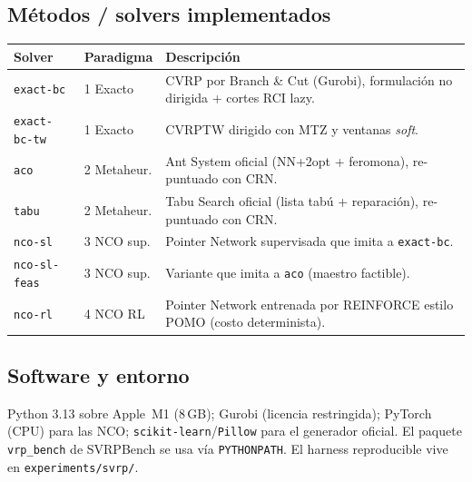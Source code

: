 \documentclass[11pt,a4paper]{article}
\newcommand{\code}[1]{\texttt{\small #1}}
\begin{document}
\subsection*{Métodos / solvers implementados}
\begin{longtable}{p{2.7cm}p{2.0cm}p{9.6cm}}
  \toprule
  \textbf{Solver} & \textbf{Paradigma} & \textbf{Descripción}\\
  \midrule
  \endhead
  \code{exact-bc} & 1 Exacto & CVRP por Branch \& Cut (Gurobi), formulación no dirigida + cortes RCI lazy.\\
  \code{exact-bc-tw} & 1 Exacto & CVRPTW dirigido con MTZ y ventanas \emph{soft}.\\
  \code{aco} & 2 Metaheur. & Ant System oficial (NN+2opt + feromona), re-puntuado con CRN.\\
  \code{tabu} & 2 Metaheur. & Tabu Search oficial (lista tabú + reparación), re-puntuado con CRN.\\
  \code{nco-sl} & 3 NCO sup. & Pointer Network supervisada que imita a \code{exact-bc}.\\
  \code{nco-sl-feas} & 3 NCO sup. & Variante que imita a \code{aco} (maestro factible).\\
  \code{nco-rl} & 4 NCO RL & Pointer Network entrenada por REINFORCE estilo POMO (costo determinista).\\
  \bottomrule
\end{longtable}

\subsection*{Software y entorno}
Python 3.13 sobre Apple~M1 (8\,GB); Gurobi (licencia restringida); PyTorch (CPU) para las NCO;
\code{scikit-learn}/\code{Pillow} para el generador oficial. El paquete \code{vrp\_bench} de
SVRPBench se usa vía \code{PYTHONPATH}. El harness reproducible vive en \code{experiments/svrp/}.
\end{document}
